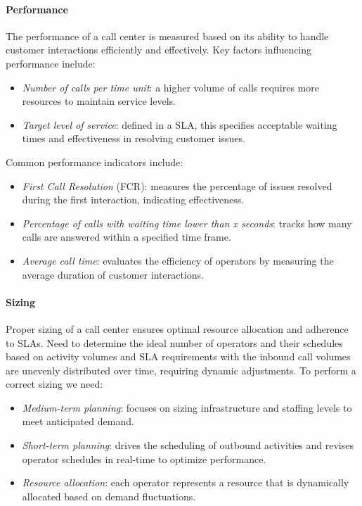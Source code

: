 \paragraph*{Performance}
The performance of a call center is measured based on its ability to handle customer interactions efficiently and effectively. 
Key factors influencing performance include:
\begin{itemize}
    \item \textit{Number of calls per time unit}: a higher volume of calls requires more resources to maintain service levels.
    \item \textit{Target level of service}: defined in a SLA, this specifies acceptable waiting times and effectiveness in resolving customer issues.
\end{itemize}
\noindent Common performance indicators include:
\begin{itemize}
    \item \textit{First Call Resolution} (FCR): measures the percentage of issues resolved during the first interaction, indicating effectiveness.
    \item \textit{Percentage of calls with waiting time lower than x seconds}: tracks how many calls are answered within a specified time frame.
    \item \textit{Average call time}: evaluates the efficiency of operators by measuring the average duration of customer interactions.
\end{itemize}

\paragraph*{Sizing}
Proper sizing of a call center ensures optimal resource allocation and adherence to SLAs. 
Need to determine the ideal number of operators and their schedules based on activity volumes and SLA requirements with the inbound call volumes are unevenly distributed over time, requiring dynamic adjustments.
To perform a correct sizing we need:
\begin{itemize}
    \item \textit{Medium-term planning}: focuses on sizing infrastructure and staffing levels to meet anticipated demand.
    \item \textit{Short-term planning}: drives the scheduling of outbound activities and revises operator schedules in real-time to optimize performance.
    \item \textit{Resource allocation}: each operator represents a resource that is dynamically allocated based on demand fluctuations.
\end{itemize}